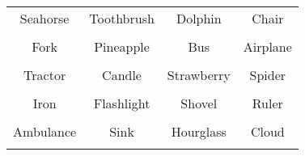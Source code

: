 \documentclass[12pt,a4paper]{article}
\begin{document}
\thispagestyle{empty}
\begin{table}[]
\centering
\Huge
\begin{tabular}{cccc}
 Seahorse& Toothbrush& Dolphin& Chair\\  & & & \\
 Fork& Pineapple& Bus& Airplane\\  & & & \\
 Tractor& Candle& Strawberry& Spider\\  & & & \\
 Iron& Flashlight& Shovel& Ruler\\  & & & \\
 Ambulance& Sink& Hourglass& Cloud\\  & & & \\
\end{tabular}
\end{table}
\end{document}
